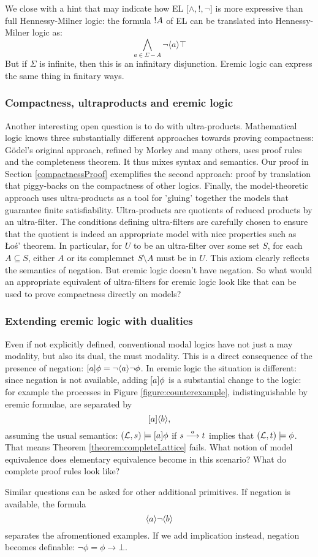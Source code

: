 We close with a hint that may indicate how EL [$\land, !, \neg$] is
more expressive than full Hennessy-Milner logic: the formula $!
A$ of EL can be translated into Hennessy-Milner logic as:
\[
\bigwedge_{a \in \Sigma - A} \neg \langle a \rangle \top
\]
But if $\Sigma$ is infinite, then this is an infinitary disjunction.
Eremic logic can express the same thing in finitary ways.

\subsubsection{Compactness, ultraproducts and eremic logic}

Another interesting open question is to do with
ultra-products. Mathematical logic knows three substantially different
approaches towards proving compactness: G\"odel's original approach,
refined by Morley and many others, uses proof rules and the
completeness theorem. It thus mixes syntax and semantics. Our proof in
Section \ref{compactnessProof} exemplifies the second approach: proof
by translation that piggy-backs on the compactness of other
logics. Finally, the model-theoretic approach uses ultra-products as a
tool for 'gluing' together the models that guarantee finite
satisfiability. Ultra-products are quotients of reduced products by an
ultra-filter. The conditions defining ultra-filters are carefully
chosen to ensure that the quotient is indeed an appropriate model with
nice properties such as \L{}o\'{s}' theorem. In particular, for $U$ to
be an ultra-filter over some set $S$, for each $A \subseteq S$, either
$A$ or its complemnet $S\setminus A$ must be in $U$. This axiom
clearly reflects the semantics of negation. But eremic logic doesn't
have negation. So what would an appropriate equivalent of
ultra-filters for eremic logic look like that can be used to prove
compactness directly on models?

\subsubsection{Extending eremic logic with dualities}

Even if not explicitly defined, conventional modal logics have not
just a may modality, but also its dual, the must modality. This is a
direct consequence of the presence of negation: $[ a ] \phi = \neg
\langle a \rangle \neg \phi$. In eremic logic the situation is different: since
negation is not available, adding $[ a ] \phi$ is a substantial
change to the logic: for example the processes in Figure
\ref{figure:counterexample}, indistinguishable by eremic formulae, are
separated by
  \[
     [ a ] \langle b \rangle,
  \]
  assuming the usual semantics: $(\mathcal{L}, s) \models [ a ] \phi$ if
  $s \stackrel{a}{\longrightarrow} t$ implies that $(\mathcal{L}, t) \models \phi$. That means
  Theorem \ref{theorem:completeLattice} fails. What notion of model
  equivalence does elementary equivalence become in this scenario?
  What do complete proof rules look like?

  Similar questions can be asked for other additional primitives. If negation is 
  available, the formula
  \[
     \langle a \rangle \neg \langle b \rangle
  \]
  separates the afromentioned examples. If we add implication instead,
  negation becomes definable: $\neg \phi = \phi \rightarrow \bot$.




